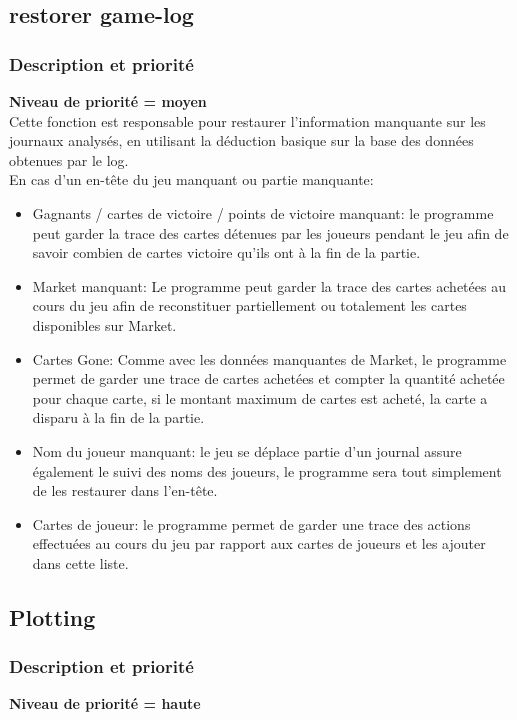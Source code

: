 \documentclass{scrreprt}
\begin{document}
\subsection{restorer game-log}
\subsubsection{Description et priorité}
\textbf{Niveau de priorité = moyen}\\

Cette fonction est responsable pour restaurer l'information manquante sur les journaux analysés, en utilisant la déduction basique sur la base des données obtenues par le log.\\
En cas d'un en-tête du jeu manquant ou partie manquante:
  \begin{itemize}
\item Gagnants / cartes de victoire / points de victoire manquant: le programme peut garder la trace des cartes détenues par les joueurs pendant le jeu afin de savoir combien de cartes victoire qu'ils ont à la fin de la partie.
\item Market manquant: Le programme peut garder la trace des cartes achetées au cours du jeu afin de reconstituer partiellement ou totalement les cartes disponibles sur Market.
\item Cartes Gone: Comme avec les données manquantes de Market, le programme permet de garder une trace de cartes achetées et compter la quantité achetée pour chaque carte, si le montant maximum de cartes est acheté, la carte a disparu à la fin de la partie.
\item Nom du joueur manquant: le jeu se déplace partie d'un journal assure également le suivi des noms des joueurs, le programme sera tout simplement de les restaurer dans l'en-tête.
\item Cartes de joueur: le programme permet de garder une trace des actions effectuées au cours du jeu par rapport aux cartes de joueurs et les ajouter dans cette liste.
  \end{itemize}

\subsection{Plotting}
\subsubsection{Description et priorité}
\textbf{Niveau de priorité = haute}\\
\end{document}
